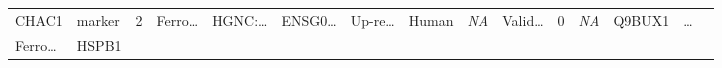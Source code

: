 \documentclass[
]{article}
\begin{document}
\begin{longtable}[]{@{}lllllllllllllll@{}}
\begin{minipage}[t]{0.05\columnwidth}
CHAC1\strut
\end{minipage} & \begin{minipage}[t]{0.04\columnwidth}\raggedright
marker\strut
\end{minipage} & \begin{minipage}[t]{0.02\columnwidth}\raggedright
2\strut
\end{minipage} & \begin{minipage}[t]{0.05\columnwidth}\raggedright
Ferro\ldots{}\strut
\end{minipage} & \begin{minipage}[t]{0.05\columnwidth}\raggedright
HGNC:\ldots{}\strut
\end{minipage} & \begin{minipage}[t]{0.05\columnwidth}\raggedright
ENSG0\ldots{}\strut
\end{minipage} & \begin{minipage}[t]{0.05\columnwidth}\raggedright
Up-re\ldots{}\strut
\end{minipage} & \begin{minipage}[t]{0.05\columnwidth}\raggedright
Human\strut
\end{minipage} & \begin{minipage}[t]{0.05\columnwidth}\raggedright
\emph{NA}\strut
\end{minipage} & \begin{minipage}[t]{0.05\columnwidth}\raggedright
Valid\ldots{}\strut
\end{minipage} & \begin{minipage}[t]{0.05\columnwidth}\raggedright
0\strut
\end{minipage} & \begin{minipage}[t]{0.05\columnwidth}\raggedright
\emph{NA}\strut
\end{minipage} & \begin{minipage}[t]{0.05\columnwidth}\raggedright
Q9BUX1\strut
\end{minipage} & \begin{minipage}[t]{0.02\columnwidth}\raggedright
\ldots{}\strut
\end{minipage}\tabularnewline
\begin{minipage}[t]{0.05\columnwidth}\raggedright
Ferro\ldots{}\strut
\end{minipage} & \begin{minipage}[t]{0.05\columnwidth}\raggedright
HSPB1\strut
\end{minipage} & \begin{minipage}[t]{0.04\columnwidth}\raggedright

\end{minipage}
\end{longtable}
\end{document}
